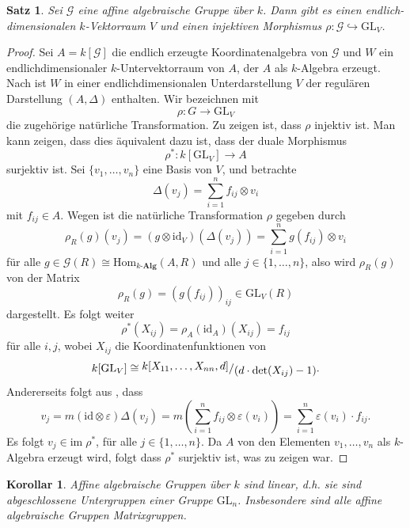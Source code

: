 \documentclass[a4paper, 11pt]{scrartcl}
\newcommand{\ringquot}[2]{{\raisebox{.2em}{\(#1\)}/\raisebox{-.2em}{\(#2\)}}}
\newcommand{\Hom}{\text{Hom}}
\newcommand{\id}{\text{id}}
\theoremstyle{basicstyle}
\newtheorem{korollar}[definition]{Korollar}
\newtheorem{satz}[definition]{Satz}
\begin{document}
    \begin{satz}
        Sei \(\mathcal{G}\) eine affine algebraische Gruppe über \(k\).
        Dann gibt es einen endlich-dimensionalen \(k\)-Vektorraum \(V\) und einen injektiven Morphismus \(\rho: \mathcal{G} \hookrightarrow \text{GL}_V\).
    \end{satz}
    \begin{proof}
        Sei \(A = k[\mathcal{G}]\) die endlich erzeugte Koordinatenalgebra von \(\mathcal{G}\) und \(W\) ein endlichdimensionaler \(k\)-Untervektorraum von \(A\), der \(A\) als \(k\)-Algebra erzeugt.
        Nach  ist \(W\) in einer endlichdimensionalen Unterdarstellung \(V\) der regulären Darstellung \((A, \Delta)\) enthalten.
        Wir bezeichnen mit 
        \[\rho: G \longrightarrow \text{GL}_V\]
        die zugehörige natürliche Transformation.
        Zu zeigen ist, dass \(\rho\) injektiv ist.
        Man kann zeigen, dass dies äquivalent dazu ist, dass der duale Morphismus
        \[\rho^\ast: k[\text{GL}_V] \longrightarrow A\]
        surjektiv ist.
        Sei \(\{v_1, \ldots, v_n\}\) eine Basis von \(V\), und betrachte
        \[\Delta(v_j) = \sum_{i=1}^{n} f_{ij} \otimes v_i\]
        mit \(f_{ij} \in A\).
        Wegen  ist die natürliche Transformation \(\rho\) gegeben durch
        \[\rho_R(g)(v_j) = (g \otimes \id_V)(\Delta(v_j)) = \sum_{i=1}^{n} g(f_{ij}) \otimes v_i\]
        für alle \(g \in \mathcal{G}(R) \cong \Hom_{k\textbf{-Alg}}(A, R)\) und alle \(j \in \{1, \ldots, n\}\), also wird \(\rho_R(g)\) von der Matrix
        \[\rho_R(g) = (g(f_{ij}))_{ij} \in \text{GL}_V(R)\]
        dargestellt.
        Es folgt weiter
        \[\rho^\ast(X_{ij}) = \rho_A(\id_A)(X_{ij}) = f_{ij}\]
        für alle \(i,j\), wobei \(X_{ij}\) die Koordinatenfunktionen von 
        \[k[\text{GL}_V] \cong \ringquot{k[X_{11}, \ldots, X_{nn}, d]}{(d\cdot \det(X_{ij}) - 1)}.\]
        Andererseits folgt aus , dass
        \[v_j = m(\id \otimes \varepsilon)\Delta(v_j) = m \left( \sum_{i=1}^{n} f_{ij} \otimes \varepsilon(v_i) \right) = \sum_{i=1}^{n} \varepsilon(v_i) \cdot f_{ij}.\]
        Es folgt \(v_j \in \text{im} \; \rho^\ast\), für alle \(j \in \{1, \ldots, n\}\).
        Da \(A\) von den Elementen \(v_1, \ldots, v_n\) als \(k\)-Algebra erzeugt wird, folgt dass \(\rho^\ast\) surjektiv ist, was zu zeigen war.
    \end{proof}

    \begin{korollar}
        Affine algebraische Gruppen über \(k\) sind linear, d.h. sie sind abgeschlossene Untergruppen einer Gruppe \(\text{GL}_n\).
        Insbesondere sind alle affine algebraische Gruppen Matrixgruppen.
    \end{korollar}
\end{document}
